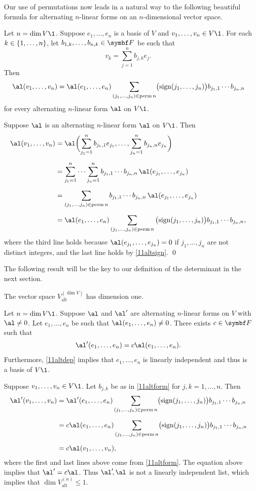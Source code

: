 Our use of permutations now leads in a natural way to the following beautiful formula for alternating $n$-linear forms on an $n$-dimensional vector space.

{Let $n = \dim V\1$. Suppose $e_1, \ldots, e_n$ is a basis of $V$ and $v_1, \ldots, v_n \in V\1$.  For each $k \in \{1, \ldots, n\}$, let $b_{1, k}, \ldots, b_{n, k} \in \F{}$ be such that
\[
v_k = \sum_{j=1}^n b_{j,k} e_j.
\]
Then
\[
\al(v_1, \ldots, v_n) =
\al( e_1, \ldots, e_n ) \sum_{(j_1, \ldots, j_n) \in \perm n} \paren[\big]{ \sign(j_1, \ldots, j_n) } b_{j_1,1} \cdots b_{j_n,n}
\]
for every alternating $n$-linear form $\al$ on $V\1$.}

\proof
Suppose $\al$ is an alternating $n$-linear form $\al$ on $V\1$. Then
\begin{align*}
\al(v_1, \ldots, v_n) &= \al\paren[\bigg]{ \sum_{j_1=1}^n b_{j_1,1} e_{j_1}, \ldots, \sum_{j_n=1}^n b_{j_n,n} e_{j_n} } \\[6bp]
&= \sum_{j_1=1}^n \cdots \sum_{j_n=1}^n b_{j_1,1} \cdots b_{j_n,n} \, \al( e_{j_1}, \ldots, e_{j_n} ) \\[6bp]
&=  \sum_{(j_1, \ldots, j_n) \in \perm n} b_{j_1,1} \cdots b_{j_n,n} \, \al( e_{j_1}, \ldots, e_{j_n} ) \\[6bp]
&= \al( e_1, \ldots, e_n ) \sum_{(j_1, \ldots, j_n) \in \perm n} \, \paren[\big]{ \sign(j_1, \ldots, j_n) } b_{j_1,1} \cdots b_{j_n,n},
\end{align*}
where the third line holds because $\al( e_{j_1}, \ldots, e_{j_n} ) = 0$ if $j_1, \ldots, j_n$ are not distinct integers, and the last line holds by \ref{11altsign}.
\qed

The following result will be the key to our definition of the determinant in the next section.

{The vector space $V^{(\dim V)}_{\text{alt}}$ has dimension one.}

\proof
Let $n = \dim V\1$. Suppose $\al$ and $\al'$ are alternating $n$-linear forms on $V$ with $\al \ne 0$.
Let $e_1, \ldots, e_n$ be such that $\al(e_1, \ldots, e_n) \ne 0$. There exists $c \in \F{}$ such that
\[
\al'(e_1, \ldots, e_n) = c \al(e_1, \ldots, e_n).
\]
Furthermore, \ref{11altdep} implies that $e_1, \ldots, e_n$ is linearly independent and thus is a basis of $V\1$.

Suppose $v_1, \ldots, v_n \in V\1$. Let $b_{j,k}$ be as in \ref{11altform} for $j,k = 1, \ldots, n$. Then
\begin{align*}
\al'(v_1, \ldots, v_n)
&= \al'( e_1, \ldots, e_n ) \sum_{(j_1, \ldots, j_n) \in \perm n} \paren[\big]{ \sign(j_1, \ldots, j_n) } b_{j_1,1} \cdots b_{j_n,n} \\[6bp]
&=  c \al( e_1, \ldots, e_n ) \sum_{(j_1, \ldots, j_n) \in \perm n} \paren[\big]{ \sign(j_1, \ldots, j_n) } b_{j_1,1} \cdots b_{j_n,n} \\[6bp]
&= c \al(v_1, \ldots, v_n),
\end{align*}
where the first and last lines above come from \ref{11altform}. The equation above implies that $\al' = c \al$. Thus $\al'\!, \al$ is not a linearly independent list, which implies that $\dim V^{(n)}_{\text{alt}} \le 1$.

